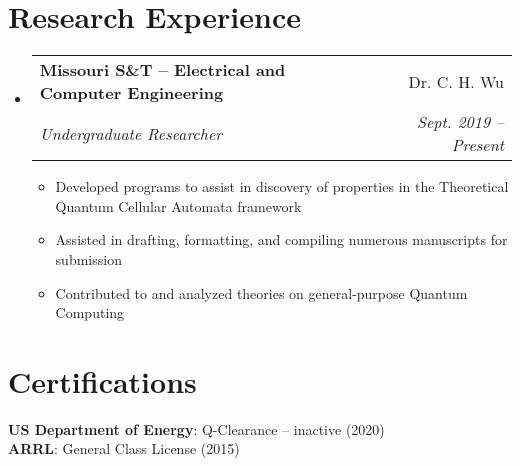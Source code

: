 \documentclass[letterpaper,11pt]{article}
\makeatletter
\newcommand{\resumeItem}[1]{
  \item\small{
    {#1 \vspace{-2pt}}
  }
}
\newcommand{\resumeSubheading}[4]{
  \vspace{-2pt}\item
    \begin{tabular*}{0.97\textwidth}[t]{l@{\extracolsep{\fill}}r}
      \textbf{#1} & #2 \\
      \textit{\small#3} & \textit{\small #4} \\
    \end{tabular*}\vspace{-7pt}
}
\newcommand{\resumeProjectHeading}[2]{
    \item
    \begin{tabular*}{0.97\textwidth}{l@{\extracolsep{\fill}}r}
      \small#1 & #2 \\
    \end{tabular*}\vspace{-7pt}
}
\newcommand{\resumeSubHeadingListStart}{\begin{itemize}[leftmargin=0.15in, label={}]}
\newcommand{\resumeSubHeadingListEnd}{\end{itemize}}
\newcommand{\resumeItemListStart}{\begin{itemize}}
\newcommand{\resumeItemListEnd}{\end{itemize}\vspace{-5pt}}
\makeatother
\begin{document}
\section{Research Experience}
\resumeSubHeadingListStart

	\resumeSubheading
		{Missouri S\&T -- Electrical and Computer Engineering}{Dr. C. H. Wu}
		{Undergraduate Researcher}{Sept. 2019 -- Present}
		\resumeItemListStart
		\resumeItem{Developed programs to assist in discovery of properties in the Theoretical Quantum Cellular Automata framework}
		\resumeItem{Assisted in drafting, formatting, and compiling numerous manuscripts for submission}
		\resumeItem{Contributed to and analyzed theories on general-purpose Quantum Computing}
		\resumeItemListEnd
\resumeSubHeadingListEnd

\section{Certifications}
\begin{itemize}[leftmargin=0.15in, label={}]
	\small{\item{
			\textbf{US Department of Energy}{: Q-Clearance -- inactive (2020)}\\
			\textbf{ARRL}{: General Class License (2015)}	
	}}
\end{itemize}

\begin{comment}
\section{Projects}
    \resumeSubHeadingListStart
      \resumeProjectHeading
          {\textbf{Gitlytics} $|$ \emph{Python, Flask, React, PostgreSQL, Docker}}{June 2020 -- Present}
          \resumeItemListStart
            \resumeItem{Developed a full-stack web application using with Flask serving a REST API with React as the frontend}
            \resumeItem{Implemented GitHub OAuth to get data from user’s repositories}
            \resumeItem{Visualized GitHub data to show collaboration}
            \resumeItem{Used Celery and Redis for asynchronous tasks}
          \resumeItemListEnd
    \resumeSubHeadingListEnd
\end{comment}

%
\end{document}
